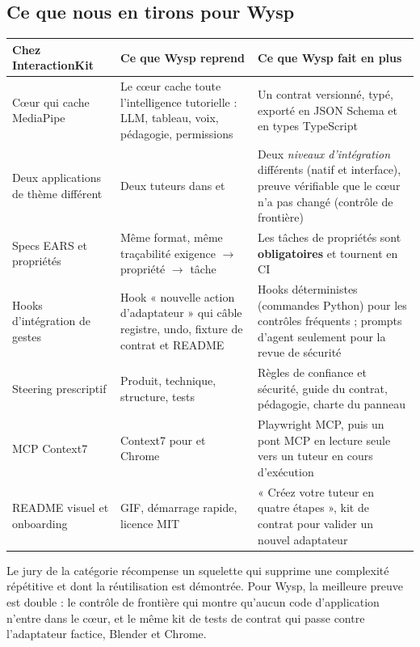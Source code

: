 \subsection{Ce que nous en tirons pour Wysp}

\begin{xltabular}{\textwidth}{@{}L{4.2cm}L{4.6cm}Y@{}}
\toprule
\textbf{Chez InteractionKit} & \textbf{Ce que Wysp reprend} & \textbf{Ce que Wysp fait en plus} \\
\midrule
Cœur qui cache MediaPipe & Le cœur cache toute l'intelligence tutorielle : LLM, tableau, voix, pédagogie, permissions & Un contrat versionné, typé, exporté en JSON Schema et en types TypeScript \\
Deux applications de thème différent & Deux tuteurs dans  et  & Deux \emph{niveaux d'intégration} différents (natif et interface), preuve vérifiable que le cœur n'a pas changé (contrôle de frontière) \\
Specs EARS et propriétés & Même format, même traçabilité exigence $\rightarrow$ propriété $\rightarrow$ tâche & Les tâches de propriétés sont \textbf{obligatoires} et tournent en CI \\
Hooks d'intégration de gestes & Hook « nouvelle action d'adaptateur » qui câble registre, undo, fixture de contrat et README & Hooks déterministes (commandes Python) pour les contrôles fréquents ; prompts d'agent seulement pour la revue de sécurité \\
Steering prescriptif & Produit, technique, structure, tests & Règles de confiance et sécurité, guide du contrat, pédagogie, charte du panneau \\
MCP Context7 & Context7 pour  et Chrome & Playwright MCP, puis un pont MCP en lecture seule vers un tuteur en cours d'exécution \\
README visuel et onboarding & GIF, démarrage rapide, licence MIT & « Créez votre tuteur en quatre étapes », kit de contrat pour valider un nouvel adaptateur \\
\bottomrule
\end{xltabular}

\begin{keybox}
Le jury de la catégorie récompense un squelette qui supprime une complexité répétitive et dont la réutilisation est démontrée. Pour Wysp, la meilleure preuve est double : le contrôle de frontière qui montre qu'aucun code d'application n'entre dans le cœur, et le même kit de tests de contrat qui passe contre l'adaptateur factice, Blender et Chrome.
\end{keybox}
